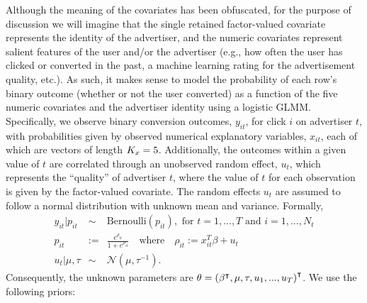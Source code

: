 \documentclass{article}\usepackage[]{graphicx}\usepackage[]{color}
\theoremstyle{definition}
\theoremstyle{plain}
\theoremstyle{plain}
\theoremstyle{plain}
\theoremstyle{definition}
\theoremstyle{plain}
\theoremstyle{plain}
\begin{document}
Although the meaning of the covariates has been obfuscated, for the
purpose of discussion we will imagine that the single retained factor-valued
covariate represents the identity of the advertiser, and the numeric
covariates represent salient features of the user and/or the advertiser
(e.g., how often the user has clicked or converted in the past, a
machine learning rating for the advertisement quality, etc.). As such,
it makes sense to model the probability of each row's binary outcome
(whether or not the user converted) as a function of the five numeric
covariates and the advertiser identity using a logistic GLMM. Specifically,
we observe binary conversion outcomes, $y_{it}$, for click $i$ on
advertiser $t$, with probabilities given by observed numerical explanatory
variables, $x_{it}$, each of which are vectors of length $K_{x}=5$.
Additionally, the outcomes within a given value of $t$ are correlated
through an unobserved random effect, $u_{t}$, which represents the
``quality'' of advertiser $t$, where the value of $t$ for each
observation is given by the factor-valued covariate. The random effects
$u_{t}$ are assumed to follow a normal distribution with unknown
mean and variance. Formally,
\begin{eqnarray*}
y_{it}\vert p_{it} & \sim &
    \textrm{Bernoulli}\left(p_{it}\right),\textrm{ for }t=1,...,T
    \textrm{ and }i=1,...,N_t\\
p_{it} & := & \frac{e^{\rho_{it}}}{1+e^{\rho_{it}}}
    \quad\textrm{where}\quad\rho_{it}:=x_{it}^{T}\beta+u_{t}\\
u_{t}\vert\mu,\tau & \sim & \mathcal{N}\left(\mu,\tau^{-1}\right).
\end{eqnarray*}
Consequently, the unknown parameters are
$\theta=\left(\beta^{\intercal},\mu,\tau,u_{1},...,u_{T}\right)^{\intercal}$.
We use the following priors:
\end{document}
